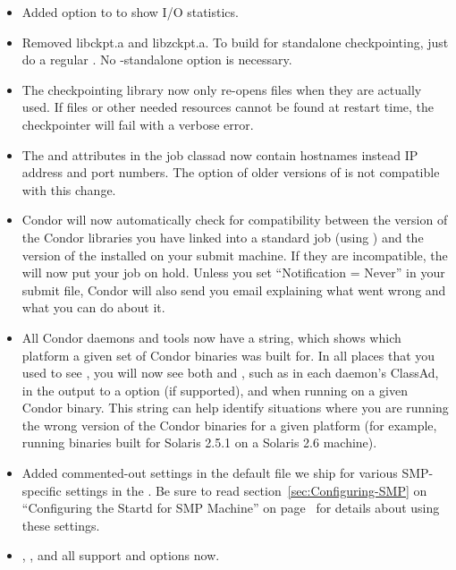 \begin{itemize}
\item Added  option to  to show I/O statistics.

\item Removed libckpt.a and libzckpt.a.  To build for standalone
checkpointing, just do a regular .
No -standalone option is necessary.

\item The checkpointing library now only re-opens files when they are
actually used.  If files or other needed resources cannot be found
at restart time, the checkpointer will fail with a verbose error.

\item The  and  attributes in
the job classad now contain hostnames instead IP address and port
numbers.  The  option of older versions of  is not
compatible with this change.

\item Condor will now automatically check for compatibility between
the version of the Condor libraries you have linked into a standard
job (using ) and the version of the 
installed on your submit machine.
If they are incompatible, the  will now put your job on
hold.  
Unless you set ``Notification = Never'' in your submit file, Condor
will also send you email explaining what went wrong and what you can
do about it.

\item All Condor daemons and tools now have a 
string, which shows which platform a given set of Condor binaries was
built for.
In all places that you used to see , you will now
see both  and , such as in
each daemon's ClassAd, in the output to a  option (if
supported), and when running  on a given Condor binary. 
This string can help identify situations where you are running the 
wrong version of the Condor binaries for a given platform (for
example, running binaries built for Solaris 2.5.1 on a Solaris 2.6
machine).   

\item Added commented-out settings in the default
 file we ship for various SMP-specific settings
in the .
Be sure to read section~\ref{sec:Configuring-SMP} on ``Configuring the
Startd for SMP Machine'' on page~\pageref{sec:Configuring-SMP} for
details about using these settings. 

\item {}, , and  all support
 and  options now.

\end{itemize}

